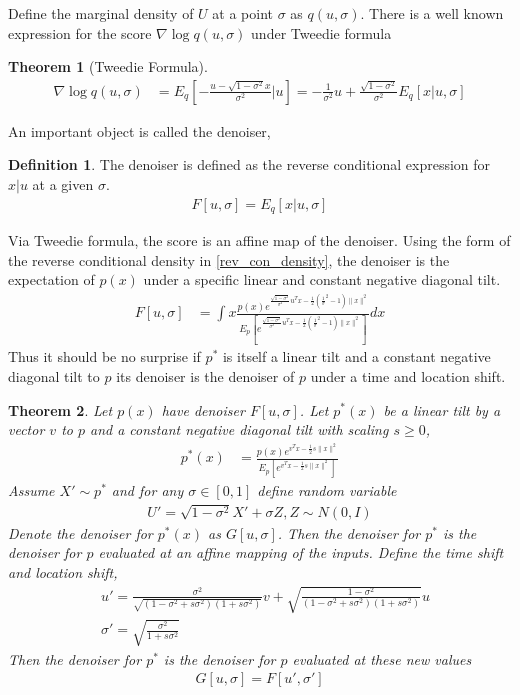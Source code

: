 \documentclass[11pt]{article}
\theoremstyle{proposition}
\theoremstyle{lemma}
\theoremstyle{corollary}
\theoremstyle{theorem}
\newtheorem{theorem}{Theorem}
\theoremstyle{definition}
\newtheorem{definition}{Definition}
\begin{document}
Define the marginal density of $U$ at a point $\sigma$ as $q(u,\sigma)$. There is a well known expression for the score $\nabla \log q(u, \sigma)$ under Tweedie formula \cite{robbins1956empirical,miyasawa1961empirical,roberts1996exponential,efron2011tweedie}
\begin{theorem}[Tweedie Formula]
\begin{align}
\nabla\log q(u, \sigma)&= E_{q}[- \frac{u - \sqrt{1-\sigma^{2}}x}{\sigma^{2}}|u]=-\frac{1}{\sigma^{2}} u + \frac{\sqrt{1-\sigma^{2}}}{\sigma^{2}} E_{q}[x|u,\sigma]
\end{align}
\end{theorem}
An important object is called the denoiser, 
\begin{definition}
The denoiser is defined as the reverse conditional expression for $x|u$ at a given $\sigma$.
\begin{align}
    F[u,\sigma] = E_{q}[x|u,\sigma]
\end{align}
\end{definition}
Via Tweedie formula, the score is an affine map of the denoiser. Using the form of the reverse conditional density in \eqref{rev_con_density}, the denoiser is the expectation of $p(x)$ under a specific linear and constant negative diagonal tilt.
\begin{align}
F[u,\sigma]&=\int x  \frac{p(x)e^{\frac{\sqrt{1-\sigma^{2}}}{\sigma^{2}}u^{T}x- \frac{1}{2}(\frac{1}{\sigma}^{2}-1)\|x\|^{2}}}{E_{p}[e^{\frac{\sqrt{1-\sigma^{2}}}{\sigma^{2}}u^{T}x- \frac{1}{2}(\frac{1}{\sigma}^{2}-1)\|x\|^{2}}]}dx
\end{align}
Thus it should be no surprise if $p^{*}$ is itself a linear tilt and a constant negative diagonal tilt to $p$ its denoiser is the denoiser of $p$ under a time and location shift.
\begin{theorem}\label{main_denoiser_thm}
Let $p(x)$ have denoiser $F[u,\sigma]$. Let $p^{*}(x)$ be a linear tilt by a vector $v$ to $p$ and a constant negative diagonal tilt with scaling $s \geq 0$,
\begin{align}
p^{*}(x)&= \frac{p(x)e^{v^{T}x - \frac{1}{2}s \|x\|^{2}}}{E_{p}[e^{v^{T}x - \frac{1}{2}s \|x\|^{2}}]} \label{const_neg_daig_tilt}
\end{align}
Assume $X' \sim p^{*}$ and for any $\sigma \in [0,1]$ define random variable
\begin{align}
U' = \sqrt{1-\sigma^{2}}X'+\sigma Z, Z \sim N(0,I)
\end{align}
Denote the denoiser for $p^{*}(x)$ as $G[u,\sigma]$. Then the denoiser for $p^{*}$ is the denoiser for $p$ evaluated at an affine mapping of the inputs. Define the time shift and location shift,
\begin{align}
&u'=\frac{\sigma^{2}}{\sqrt{(1-\sigma^{2}+s \sigma^{2})(1+s \sigma^{2})}} v+ \sqrt{\frac{1-\sigma^{2}}{(1-\sigma^{2}+s \sigma^{2})(1+s \sigma^{2})}} u \label{u_prime}\\ 
&\sigma'=\sqrt{\frac{\sigma^{2}}{1+s \sigma^{2}}} \label{sigma_prime}
\end{align}
Then the denoiser for $p^{*}$ is the denoiser for $p$ evaluated at these new values
\begin{align}
G[u,\sigma]= F[u', \sigma']
\end{align}
\end{theorem}
\end{document}
